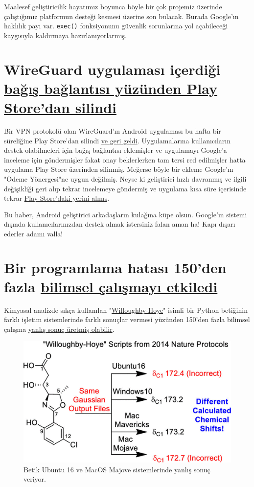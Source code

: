 \documentclass[11pt]{article}
\begin{document}
Maalesef geliştiricilik hayatımız boyunca böyle bir çok projemiz üzerinde
çalıştığımız platformun desteği kesmesi üzerine son bulacak. Burada Google'ın
haklılık payı var. \texttt{exec()} fonksiyonunu güvenlik sorunlarına yol açabileceği
kaygısıyla kaldırmaya hazırlanıyorlarmış.
\section{WireGuard uygulaması içerdiği \href{https://lists.zx2c4.com/pipermail/wireguard/2019-October/004596.html}{bağış bağlantısı yüzünden Play Store'dan silindi}}
\label{sec:org0ef7dd5}
Bir VPN protokolü olan WireGuard'ın Android uygulaması bu hafta bir süreliğine
Play Store'dan silindi \href{https://lists.zx2c4.com/pipermail/wireguard/2019-October/004597.html}{ve geri geldi}. Uygulamalarına kullanıcıların destek
olabilmeleri için bağış bağlantısı eklemişler ve uygulamayı Google'a inceleme
için göndermişler fakat onay beklerlerken tam tersi red edilmişler hatta
uygulama Play Store üzerinden silinmiş. Meğerse böyle bir ekleme Google'ın
"Ödeme Yönergesi"ne uygun değilmiş. Neyse ki geliştirici hızlı davranmış ve
ilgili değişikliği geri alıp tekrar incelemeye göndermiş ve uygulama kısa süre
içerisinde tekrar \href{https://play.google.com/store/apps/details?id=com.wireguard.android}{Play Store'daki yerini almış}.

Bu haber, Android geliştirici arkadaşların kulağına küpe olsun. Google'ın
sistemi dışında kullanıcılarınızdan destek almak istersiniz falan aman ha! Kapı
dışarı ederler adamı valla!
\section{Bir programlama hatası 150'den fazla \href{https://arstechnica.com/information-technology/2019/10/chemists-discover-cross-platform-python-scripts-not-so-cross-platform/}{bilimsel çalışmayı etkiledi}}
\label{sec:org01a1b2d}
Kimyasal analizde sıkça kullanılan "\href{https://www.nature.com/articles/nprot.2014.042}{Willoughby-Hoye}" isimli bir Python
betiğinin farklı işletim sistemlerinde farklı sonuçlar vermesi yüzünden 150'den
fazla bilimsel çalışma \href{https://pubs.acs.org/doi/full/10.1021/acs.orglett.9b03216}{yanlış sonuç üretmiş olabilir}.

\begin{figure}[htbp]
\centering
\includegraphics[width=.9\linewidth]{gorseller/programlama-hatasi-bilimi-etkiledi.png}
\caption{Betik Ubuntu 16 ve MacOS Majove sistemlerinde yanlış sonuç veriyor.}
\end{figure}
\end{document}
